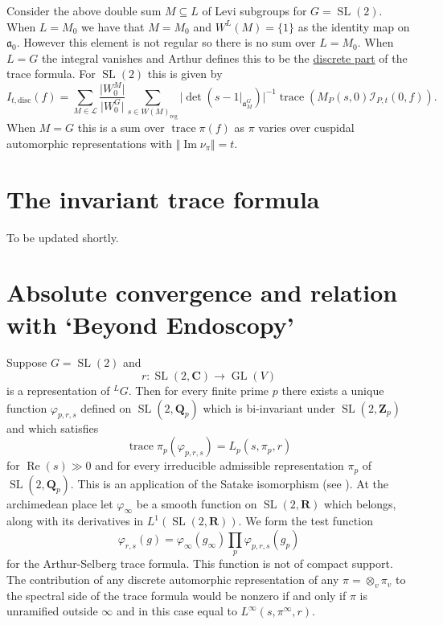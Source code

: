 \documentclass[11pt]{amsart}
\def\C{\mathbf C}
\def\Q{\mathbf Q}
\def\R{\mathbf R}
\def\Z{\mathbf Z}
\def\III{\mathcal I}
\def\LLL{\mathcal L}
\def\aaa{\mathfrak a}
\def\cb#1{{\color{blue}#1}}
\def\det{\operatorname{det}}
\def\disc{\text{disc}}
\def\gl{\operatorname{GL}}
\def\Im{\operatorname{Im}}
\def\Lone{L^1}
\def\mod#1{\lvert #1 \rvert} %
\def\norm#1{\Vert #1 \Vert} %
\def\Re{\operatorname{Re}}
\def\reg{\operatorname{reg}}
\def\sl{\operatorname{SL}}
\def\trace{\operatorname{trace}}
\theoremstyle{remark}
\begin{document}
\cb{Consider the above double sum $M\subseteq L$ of Levi subgroups for $G = \sl(2)$. When $L = M_0$ we have that $M=M_0$ and $W^L(M) = \{1\}$ as the identity map on $\aaa_0$. However this element is not regular so there is no sum over $L=M_0$. When $L=G$ the integral vanishes and Arthur defines this to be the \underline{discrete part} of the trace formula. For $\sl(2)$ this is given by
\[ I_{t, \disc}(f) = \sum_{M \in \LLL} \frac{\mod{W_0^M}}{\mod{W_0^G}} \sum_{s \in W(M)_{\reg}} \mod{\det(s-1|_{\aaa_M^G})}^{-1} \trace\left(M_P(s, 0) \III_{P, t}(0, f) \right). \]
When $M=G$ this is a sum over $\trace \pi(f)$ as $\pi$ varies over cuspidal automorphic representations with $\norm{\Im \nu_\pi} = t$. 
}
\section{The invariant trace formula}

{\color{red} To be updated shortly.}




\section{Absolute convergence and relation with `Beyond Endoscopy'}

Suppose $G = \sl(2)$ and 
\[ r : \sl(2, \C) \to \gl(V) \]
is a representation of ${}^LG$. Then for every finite prime $p$ there exists a unique function $\varphi_{p, r, s}$ defined on $\sl(2, \Q_p)$ which is bi-invariant under $\sl(2, \Z_p)$ and which satisfies
\[ \trace \pi_p(\varphi_{p, r, s}) = L_p(s, \pi_p, r) \]
for $\Re(s) \gg 0$ and for every irreducible admissible representation $\pi_p$ of $\sl(2, \Q_p)$. This is an application of the Satake isomorphism (see \cite{MR3220933}). At the archimedean place let $\varphi_\infty$ be a smooth function on $\sl(2, \R)$ which belongs, along with its derivatives in $\Lone(\sl(2, \R))$. We form the test function
\[ \varphi_{r, s}(g) = \varphi_\infty(g_\infty) \displaystyle\prod_p \varphi_{p, r, s}(g_p) \]
for the Arthur-Selberg trace formula. This function is not of compact support. The contribution of any discrete automorphic representation of any $\pi = \otimes_v \pi_v$ to the spectral side of the trace formula would be nonzero if and only if $\pi$ is unramified outside $\infty$ and in this case equal to $L^\infty(s, \pi^\infty, r)$. 
\end{document}
